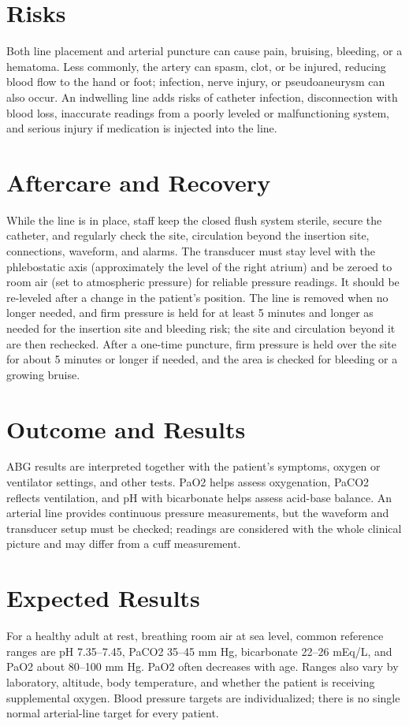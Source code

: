 \section*{Risks}
Both line placement and arterial puncture can cause pain, bruising, bleeding, or a hematoma. Less commonly, the artery can spasm, clot, or be injured, reducing blood flow to the hand or foot; infection, nerve injury, or pseudoaneurysm can also occur. An indwelling line adds risks of catheter infection, disconnection with blood loss, inaccurate readings from a poorly leveled or malfunctioning system, and serious injury if medication is injected into the line.

\section*{Aftercare and Recovery}
While the line is in place, staff keep the closed flush system sterile, secure the catheter, and regularly check the site, circulation beyond the insertion site, connections, waveform, and alarms. The transducer must stay level with the phlebostatic axis (approximately the level of the right atrium) and be zeroed to room air (set to atmospheric pressure) for reliable pressure readings. It should be re-leveled after a change in the patient's position. The line is removed when no longer needed, and firm pressure is held for at least 5 minutes and longer as needed for the insertion site and bleeding risk; the site and circulation beyond it are then rechecked. After a one-time puncture, firm pressure is held over the site for about 5 minutes or longer if needed, and the area is checked for bleeding or a growing bruise.

\section*{Outcome and Results}
ABG results are interpreted together with the patient's symptoms, oxygen or ventilator settings, and other tests. PaO2 helps assess oxygenation, PaCO2 reflects ventilation, and pH with bicarbonate helps assess acid-base balance. An arterial line provides continuous pressure measurements, but the waveform and transducer setup must be checked; readings are considered with the whole clinical picture and may differ from a cuff measurement.

\section*{Expected Results}
For a healthy adult at rest, breathing room air at sea level, common reference ranges are pH 7.35--7.45, PaCO2 35--45 mm Hg, bicarbonate 22--26 mEq/L, and PaO2 about 80--100 mm Hg. PaO2 often decreases with age. Ranges also vary by laboratory, altitude, body temperature, and whether the patient is receiving supplemental oxygen. Blood pressure targets are individualized; there is no single normal arterial-line target for every patient.


